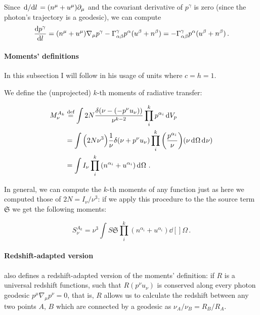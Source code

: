 \documentclass[main.tex]{subfiles}
\begin{document}
Since \(\dv*{}{l} = (n^\mu + u^\mu) \partial_\mu\) and the covariant derivative of \(p^\gamma\) is zero (since the photon's trajectory is a geodesic), we can compute
\begin{equation}
  \dv{p^\gamma}{l} = (n^\mu + u^\mu ) \nabla_\mu p^\gamma - \Gamma ^\gamma _{\alpha \beta} p^\alpha (u^\beta + n^\beta)
  = - \Gamma ^\gamma _{\alpha \beta} p^\alpha (u^\beta + n^\beta) \,.
\end{equation}

\paragraph{Moments' definitions}

In this subsection I will follow \textcite[]{Thorne:1981feb} in his usage of units where \(c=h=1\).

We define the (unprojected) \(k\)-th moments of radiative transfer:

\begin{subequations}
\begin{align}
   M _\nu ^{A_k}
   &\defeq \int 2N \frac{\delta (\nu - (-p^\nu u_\nu))}{\nu^{k-2}} \prod_i^k p^{\alpha_i} \dd{V_p} \\
   &= \int \qty(2N \nu^3) \frac{1}{\nu} \delta (\nu +p^\nu u_\nu) \prod_i^k \qty(\frac{p^{\alpha_i}}{\nu}) \qty(\nu \dd[]{\Omega} \dd[]{\nu})  \\
   &= \int  I_\nu \prod_i^k \qty(n^{\alpha_i} + u^{\alpha_i}) \dd[]{\Omega}\,. \label{eq:simplified-moment-definition}
\end{align}
\end{subequations}

In general, we can compute the \(k\)-th moments of any function just as here we computed those of \(2N = I_\nu / \nu^3\):
if we apply this procedure to the the source term \(\mathfrak S\) we get the following moments:

\begin{equation}
   S_\nu ^{A_k} = \nu^3 \int S \mathfrak S \prod_i^k (n^{\alpha_i} + u^{\alpha_i}) \dd[]{\Omega} \,.
\end{equation}

\paragraph{Redshift-adapted version}

\textcite[]{Thorne:1981feb} also defines a redshift-adapted version of the moments' definition: if \(R\) is a universal redshift functions, such that \(R (p^\nu u_\nu)\) is conserved along every photon geodesic \(p^\mu \nabla_\mu p^\nu = 0\), that is, \(R\) allows us to calculate the redshift between any two points \(A\), \(B\) which are connected by a geodesic as \(\nu_A / \nu_B = R_B / R_A\).
\end{document}
